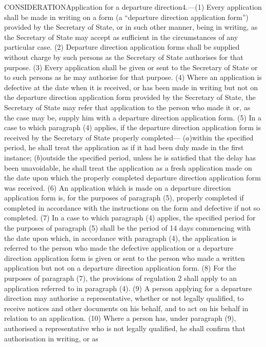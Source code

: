 \documentclass[a4paper]{article}
\begin{document}
CONSIDERATIONApplication for a departure direction4.—(1) Every application shall
be made in writing on a form (a “departure direction application form”) provided
by the Secretary of State, or in such other manner, being in writing, as the
Secretary of State may accept as sufficient in the circumstances of any
particular case.
(2) Departure direction application forms shall be supplied without charge by
such persons as the Secretary of State authorises for that purpose.
(3) Every application shall be given or sent to the Secretary of State or to
such persons as he may authorise for that purpose.
(4) Where an application is defective at the date when it is received, or has
been made in writing but not on the departure direction application form
provided by the Secretary of State, the Secretary of State may refer that
application to the person who made it or, as the case may be, supply him with a
departure direction application form.
(5) In a case to which paragraph (4) applies, if the departure direction
application form is received by the Secretary of State properly completed—
($a$)within the specified period, he shall treat the application as if it had been
duly made in the first instance;
($b$)outside the specified period, unless he is satisfied that the delay has been
unavoidable, he shall treat the application as a fresh application made on the
date upon which the properly completed departure direction application form was
received.
(6) An application which is made on a departure direction application form is,
for the purposes of paragraph (5), properly completed if completed in accordance
with the instructions on the form and defective if not so completed.
(7) In a case to which paragraph (4) applies, the specified period for the
purposes of paragraph (5) shall be the period of 14 days commencing with the
date upon which, in accordance with paragraph (4), the application is referred
to the person who made the defective application or a departure direction
application form is given or sent to the person who made a written application
but not on a departure direction application form.
(8) For the purposes of paragraph (7), the provisions of regulation 2 shall
apply to an application referred to in paragraph (4).
(9) A person applying for a departure direction may authorise a representative,
whether or not legally qualified, to receive notices and other documents on his
behalf, and to act on his behalf in relation to an application.
(10) Where a person has, under paragraph (9), authorised a representative who is
not legally qualified, he shall confirm that authorisation in writing, or as
\end{document}
